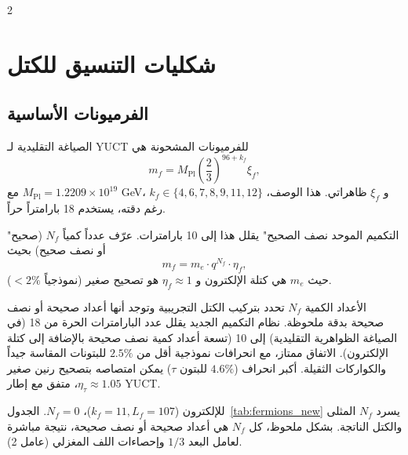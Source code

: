 \documentclass[11pt,a4paper]{article}
\begin{document}
\begin{multicols}{2}
		\section{شكليات التنسيق للكتل}
		\label{sec:formalism}
		
		\subsection{الفرميونات الأساسية}
		
		الصياغة التقليدية لـ YUCT للفرميونات المشحونة هي
		\begin{equation}
			m_f = M_{\mathrm{Pl}} \left( \frac{2}{3} \right)^{96 + k_f} \xi_f,
			\label{eq:mass_fermion}
		\end{equation}
		مع \(M_{\mathrm{Pl}} = 1.2209\times 10^{19}\) GeV، \(k_f \in \{4,6,7,8,9,11,12\}\) و \(\xi_f\) ظاهراتي. هذا الوصف، رغم دقته، يستخدم 18 بارامتراً حراً.
		
		"التكميم الموحد نصف الصحيح" يقلل هذا إلى 10 بارامترات. عرّف عدداً كمياً \(N_f\) (صحيح أو نصف صحيح) بحيث
		\begin{equation}
			m_f = m_e \cdot q^{N_f} \cdot \eta_f,
			\label{eq:mass_quantized}
		\end{equation}
		حيث \(m_e\) هي كتلة الإلكترون و \(\eta_f \approx 1\) هو تصحيح صغير (نموذجياً \(<2\%\)).
		
		الأعداد الكمية \(N_f\) تحدد بتركيب الكتل التجريبية وتوجد أنها أعداد صحيحة أو نصف صحيحة بدقة ملحوظة. نظام التكميم الجديد يقلل عدد البارامترات الحرة من 18 (في الصياغة الظواهرية التقليدية) إلى 10 (تسعة أعداد كمية نصف صحيحة بالإضافة إلى كتلة الإلكترون). الاتفاق ممتاز، مع انحرافات نموذجية أقل من \(2.5\%\) للبتونات المقاسة جيداً والكواركات الثقيلة. أكبر انحراف (\(4.6\%\) للبتون \(\tau\)) يمكن امتصاصه بتصحيح رنين صغير \(\eta_\tau \approx 1.05\)، متفق مع إطار YUCT.
		
		للإلكترون (\(k_f=11, L_f=107\))، \(N_f=0\). الجدول~\ref{tab:fermions_new} يسرد \(N_f\) المثلى والكتل الناتجة. بشكل ملحوظ، كل \(N_f\) هي أعداد صحيحة أو نصف صحيحة، نتيجة مباشرة لعامل البعد \(1/3\) وإحصاءات اللف المغزلي (عامل 2).
		

\end{multicols}
\end{document}
